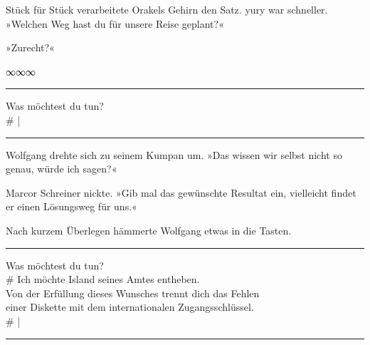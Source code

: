 
Stück für Stück verarbeitete Orakels Gehirn den Satz. yury war schneller. »Welchen Weg hast du für unsere Reise geplant?«


»Zurecht?«


\begin{center}
∞∞∞
\end{center}

\noindent \parbox{\textwidth}{ \vspace{3ex} \hrule \vspace{3ex}

    \begin{tiny}
    \begin{ttfamily}

\noindent Was möchtest du tun?\\
\noindent \# |


    \end{ttfamily}
    \end{tiny}

\vspace{3ex} \hrule \vspace{3ex} }

Wolfgang drehte sich zu seinem Kumpan um. »Das wissen wir selbst nicht so genau, würde ich sagen?«

Marcor Schreiner nickte. »Gib mal das gewünschte Resultat ein, vielleicht findet er einen Lösungsweg für uns.«

Nach kurzem Überlegen hämmerte Wolfgang etwas in die Tasten.

\noindent \parbox{\textwidth}{ \vspace{3ex} \hrule \vspace{3ex}

    \begin{tiny}
    \begin{ttfamily}

\noindent Was möchtest du tun?\\
\noindent \# Ich möchte Island seines Amtes entheben.\\
\noindent Von der Erfüllung dieses Wunsches trennt dich das Fehlen\\
\noindent einer Diskette mit dem internationalen Zugangsschlüssel.\\
\noindent \# |

    \end{ttfamily}
    \end{tiny}

\vspace{3ex} \hrule \vspace{3ex} }

